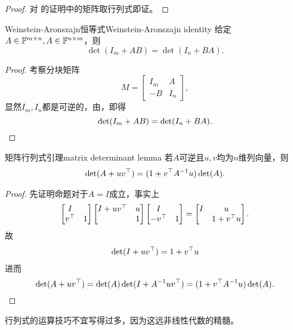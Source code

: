 \begin{proof}
	对 的证明中的矩阵取行列式即证。
\end{proof}

\begin{theorem}
	{Weinstein-Aronszajn恒等式}{Weinstein-Aronszajn identity}
	给定$A\in\mathbb F^{m\times n},A\in\mathbb F^{n\times m}$，则 
	\begin{equation}
		\det(I_m+AB)=\det(I_n+BA).
	\end{equation}
\end{theorem}
\begin{proof}
	考察分块矩阵
	\[
		M=\begin{bmatrix}
			I_m&A\\-B&I_n
		\end{bmatrix},
	\]
	显然$I_m,I_n$都是可逆的，由，即得
	\[
		\det(I_m+AB)=\det(I_n+BA).
		\qedhere
	\]
\end{proof}


\begin{theorem}
	{矩阵行列式引理}{matrix determinant lemma}
	若$A$可逆且$u,v$均为$n$维列向量，则
	\begin{align}
		\det(A+uv^\top)=(1+v^\top A^{-1} u)\det(A).
	\end{align}
\end{theorem}
\begin{proof}
	先证明命题对于$A=I$成立，事实上
	\begin{align*}
		\begin{bmatrix}
			I\\v^\top&1
		\end{bmatrix}
		\begin{bmatrix}
			I+uv^\top&u\\ &1
		\end{bmatrix}
		\begin{bmatrix}
			I\\-v^\top&1
		\end{bmatrix}=
		\begin{bmatrix}
			I&u\\ &1+v^\top u
		\end{bmatrix}.
	\end{align*}
	故
	\begin{align}
		\det(I+uv^\top)=1+v^\top u
	\end{align}
	进而 
	\[
		\det(A+uv^\top)=\det(A)\det(I+A^{-1} uv^\top)=(1+v^\top A^{-1} u)\det(A).
		\qedhere
	\]
\end{proof}
\begin{remark}
	行列式的运算技巧不宜写得过多，因为这远非线性代数的精髓。
\end{remark}
